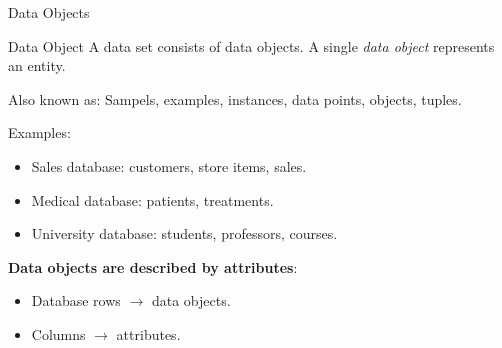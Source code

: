 \begin{frame}{Data Objects}
  \begin{block}{Data Object}
    A data set consists of data objects. A single \textit{data object} represents an entity.
  \end{block}

  Also known as: Sampels, examples, instances, data points, objects, tuples.\\\medskip

  Examples:
  \begin{itemize}
  \item Sales database: customers, store items, sales.
  \item Medical database: patients, treatments.
  \item University database: students, professors, courses.
  \end{itemize}

  \textbf{Data objects are described by attributes}:
  \begin{itemize}
  \item Database rows $\rightarrow$ data objects.
  \item Columns $\rightarrow$ attributes.
  \end{itemize}
\end{frame}


